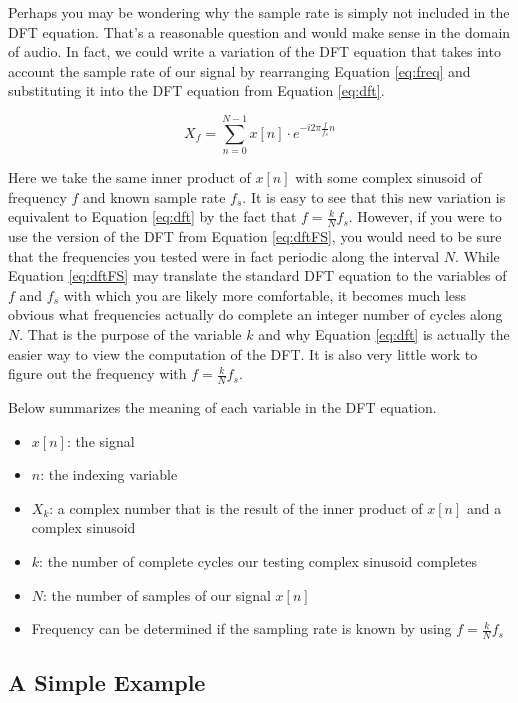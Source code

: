 	Perhaps
you may be wondering why the sample rate is simply not included in the DFT equation.  That's a reasonable 
question and would make sense in the domain of audio.  In fact, we could write a variation of the DFT equation
that takes into account the sample rate of our signal by rearranging Equation \ref{eq:freq} and substituting it
into the DFT equation from Equation \ref{eq:dft}.

\begin{equation}
\label{eq:dftFS}
	X_f = \sum_{n = 0}^{N - 1}x[n] \cdot e^{-i2\pi \frac{f}{f_s}n}
\end{equation}

\noindent Here we take the same inner product of $x[n]$ with some complex sinusoid of frequency $f$ and known sample
rate $f_s$.  It is easy to see that this new variation is equivalent to Equation \ref{eq:dft} by the fact that 
$f = \frac{k}{N}f_s$.  However, if you were to use the version of the DFT from Equation \ref{eq:dftFS}, you
would need to be sure that the frequencies you tested were in fact periodic along the interval $N$.  While Equation
\ref{eq:dftFS} may translate the standard DFT equation to the variables of $f$ and $f_s$ with which you are likely
more comfortable, it becomes much less obvious what frequencies actually do complete an integer number
of cycles along $N$.  That is the purpose of the variable $k$ and why Equation \ref{eq:dft} is actually the easier
way to view the computation of the DFT.  It is also very little work to figure out the frequency with 
$f = \frac{k}{N}f_s$.

Below summarizes the meaning of each variable in the DFT equation.

\begin{itemize}
	\item $x[n]$: the signal
	\item $n$: the indexing variable
	\item $X_k$: a complex number that is the result of the inner product of $x[n]$ and a complex sinusoid
	\item $k$: the number of complete cycles our testing complex sinusoid completes
	\item $N$: the number of samples of our signal $x[n]$
	\item Frequency can be determined if the sampling rate is known by using $f = \frac{k}{N}f_s$
\end{itemize}

\subsection*{A Simple Example}

